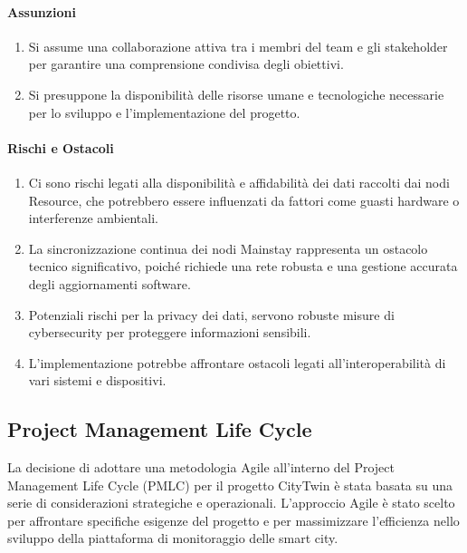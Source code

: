 \paragraph{Assunzioni}

\begin{enumerate}
    \item Si assume una collaborazione attiva tra i membri del team e gli stakeholder per garantire una comprensione condivisa degli obiettivi.

    \item Si presuppone la disponibilità delle risorse umane e tecnologiche necessarie per lo sviluppo e l'implementazione del progetto.
\end{enumerate}

\paragraph{Rischi e Ostacoli}

\begin{enumerate}
    \item Ci sono rischi legati alla disponibilità e affidabilità dei dati raccolti dai nodi Resource, che potrebbero essere influenzati da fattori come guasti hardware o interferenze ambientali.
    \item La sincronizzazione continua dei nodi Mainstay rappresenta un ostacolo tecnico significativo, poiché richiede una rete robusta e una gestione accurata degli aggiornamenti software.
    \item Potenziali rischi per la privacy dei dati, servono robuste misure di cybersecurity per proteggere informazioni sensibili.
    \item L'implementazione potrebbe affrontare ostacoli legati all'interoperabilità di vari sistemi e dispositivi.
\end{enumerate}

\subsection{Project Management Life Cycle}

La decisione di adottare una metodologia Agile all'interno del Project Management Life Cycle (PMLC) per il progetto CityTwin è stata basata su una serie di considerazioni strategiche e operazionali. L'approccio Agile è stato scelto per affrontare specifiche esigenze del progetto e per massimizzare l'efficienza nello sviluppo della piattaforma di monitoraggio delle smart city.

